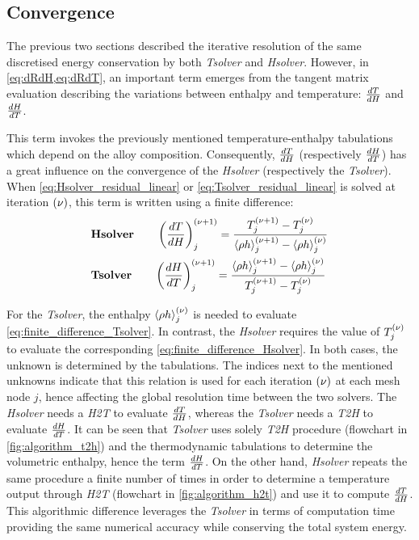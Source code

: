 \subsection{Convergence}
%
The previous two sections described the iterative resolution of the same discretised energy 
conservation by both \emph{Tsolver} and \emph{Hsolver}. However, in \cref{eq:dRdH,eq:dRdT}, an important 
term emerges from the tangent matrix evaluation describing the variations between enthalpy and temperature: 
$\frac{dT}{dH}$ and $\frac{dH}{dT}$. 

This term invokes the previously mentioned temperature-enthalpy 
tabulations which depend on the alloy composition. Consequently,  $\frac{dT}{dH}$ (respectively $\frac{dH}{dT}$)
has a great influence on the convergence of the \emph{Hsolver} (respectively the \emph{Tsolver}). 
When \cref{eq:Hsolver_residual_linear} or \cref{eq:Tsolver_residual_linear} is solved at iteration ${\left( \nu \right)}$, this term is written using a finite difference:
\begin{align}
\label{eq:finite_difference_Hsolver}
& \textbf{Hsolver} \qquad \left( \frac{dT}{dH} \right)^{{\left( \nu+1 \right)}}_{j} = \frac{T_j^{{\left( \nu+1 \right)}} - T_j^{{\left( \nu \right)}}}{\left \langle  \rho h  \right \rangle_j^{{\left( \nu+1 \right)}} - \left \langle  \rho h  \right \rangle_j^{{\left( \nu \right)}}} \\ 
\label{eq:finite_difference_Tsolver}
& \textbf{Tsolver} \qquad \left( \frac{dH}{dT} \right)^{{\left( \nu+1 \right)}}_{j} = \frac{\left \langle  \rho h  \right \rangle_j^{{\left( \nu+1 \right)}} - \left \langle  \rho h  \right \rangle_j^{{\left( \nu \right)}}}{T_j^{{\left( \nu+1 \right)}} - T_j^{{\left( \nu \right)}}}
\end{align}

For the \emph{Tsolver}, the enthalpy $\left \langle  \rho h  \right \rangle_j^{{\left( \nu \right)}}$ is needed to evaluate \cref{eq:finite_difference_Tsolver}. 
In contrast, the \emph{Hsolver} requires the value of $T_j^{{\left( \nu \right)}}$ to evaluate the corresponding \cref{eq:finite_difference_Hsolver}.
In both cases, the unknown is determined by the tabulations. The indices next to the mentioned unknowns
indicate that this relation is used for each iteration ${\left( \nu \right)}$ at each mesh node $j$, hence affecting the global resolution time 
between the two solvers. The \emph{Hsolver} needs a \emph{H2T} to evaluate $\frac{dT}{dH}$, whereas the \emph{Tsolver} needs a \emph{T2H} to evaluate $\frac{dH}{dT}$.
It can be seen that \emph{Tsolver} uses solely \emph{T2H} procedure (flowchart in \cref{fig:algorithm_t2h}) and the thermodynamic tabulations to determine the volumetric enthalpy, 
hence the term $\frac{dH}{dT}$. On the other hand, \emph{Hsolver} repeats the same procedure a finite number of times in order to 
determine a temperature output through \emph{H2T} (flowchart in \cref{fig:algorithm_h2t}) and use it to compute $\frac{dT}{dH}$. This algorithmic difference leverages the 
\emph{Tsolver} in terms of computation time providing the same numerical accuracy while conserving the total system energy. 

